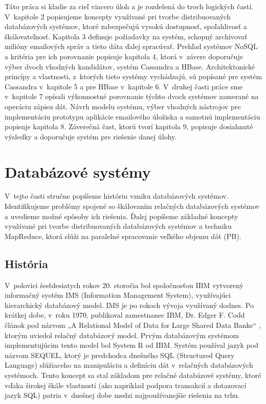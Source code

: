 \documentclass[11pt,twoside,a4paper]{book}
\begin{document}
Táto práca si kladie za cieľ viacero úloh a je rozdelená do troch logických častí. V~kapitole 2 popisujeme koncepty využívané pri tvorbe distribuovaných databázových systémov, ktoré zabezpečujú vysokú dostupnosť, spoľahlivosť a škálovateľnosť. Kapitola 3 definuje požiadavky na systém, schopný archivovať milióny emailových správ a tieto dáta ďalej spracúvať. Prehľad systémov NoSQL a kritéria pre ich porovnanie popisuje kapitola 4, ktorá v~závere doporučuje výber dvoch vhodných kandidátov, systém Cassandra a HBase. Architektonické princípy a vlastnosti, z~ktorých tieto systémy vychádzajú, sú popísané pre systém Cassandra v~kapitole 5 a pre HBase v~kapitole 6.
V~druhej časti práce sme v~kapitole 7 opísali výkonnostné porovnanie týchto dvoch systémov zamerané na operáciu zápisu dát. Návrh modelu systému, výber vhodných nástrojov pre implementáciu prototypu aplikácie emailového úložiska a samotnú implementáciu popisuje kapitola 8. 
Záverečná čast, ktorú tvorí kapitola 9, popisuje dosiahnuté výsledky a doporučuje systém pre riešenie danej úlohy.







\chapter{Databázové systémy}

V~tejto časti stručne popíšeme históriu vzniku databázových systémov. Identifikujeme problémy spojené so škálovaním relačných databázových systémov a uvedieme možné spôsoby ich riešenia. Ďalej popíšeme základné koncepty využívané pri tvorbe distribuovaných databázových systémov a techniku MapReduce, ktorá slúži na paralelné spracovanie veľkého objemu dát (PB).

\section{História}

V~polovici šesťdesiatych rokov 20. storočia bol spoločnosťou IBM vytvorený informačný systém IMS (Information Management System), využívajúci hierarchický databázový model. IMS je po rokoch vývoja využívaný dodnes. Po krátkej dobe, v~roku 1970, publikoval zamestnanec IBM, Dr. Edger F. Codd článok pod názvom „A Relational Model of Data for Large Shared Data Banks“ \cite{Codd:1970:RMD:362384.362685}, ktorým uviedol relačný databázový model. Prvým databázovým systémom implementujúcim tento model bol System R od IBM. Systém používal jazyk pod názvom SEQUEL, ktorý je predchodca dnešného SQL (Structured Query Language) slúžiaceho na manipuláciu a definíciu dát v~relačných databázových systémoch. Tento koncept sa stal základom pre relačné databázové systémy, ktoré vďaka širokej škále vlastností (ako napríklad podpora transakcií a dotazovací jazyk SQL) patria v~dnešnej  dobe medzi najpoužívanejšie riešenia na trhu.
\end{document}
